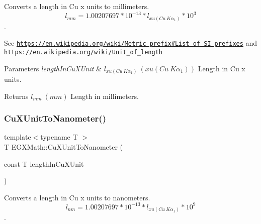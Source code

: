 Converts a length in Cu x units to millimeters. \[ l_{mm}=1.00207697*10^{-13} * l_{xu(Cu\ K\alpha_1)} * 10^{3} \]. 

See \href{https://en.wikipedia.org/wiki/Metric_prefix#List_of_SI_prefixes}{\tt https\+://en.\+wikipedia.\+org/wiki/\+Metric\+\_\+prefix\#\+List\+\_\+of\+\_\+\+S\+I\+\_\+prefixes} and \href{https://en.wikipedia.org/wiki/Unit_of_length}{\tt https\+://en.\+wikipedia.\+org/wiki/\+Unit\+\_\+of\+\_\+length} 
\begin{DoxyParams}{Parameters}
{\em length\+In\+Cu\+X\+Unit} & $ l_{xu(Cu\ K\alpha_1)}\ (xu(Cu\ K\alpha_1))$ Length in Cu x units. \\
\hline
\end{DoxyParams}
\begin{DoxyReturn}{Returns}
$ l_{mm}\ (mm)$ Length in millimeters. 
\end{DoxyReturn}
\mbox{\label{group___e_g_x_math-_conversions-_length_conversions-_non-_s_i-_cu_x_unit-_s_i_gac14b0200f069cb1ec0ba03540d93230a}} 
\subsubsection{\texorpdfstring{Cu\+X\+Unit\+To\+Nanometer()}{CuXUnitToNanometer()}}
{\footnotesize\ttfamily template$<$typename T $>$ \\
T E\+G\+X\+Math\+::\+Cu\+X\+Unit\+To\+Nanometer (\begin{DoxyParamCaption}\item[{const T}]{length\+In\+Cu\+X\+Unit }\end{DoxyParamCaption})}



Converts a length in Cu x units to nanometers. \[ l_{nm}=1.00207697*10^{-13} * l_{xu(Cu\ K\alpha_1)} * 10^{9} \]. 

